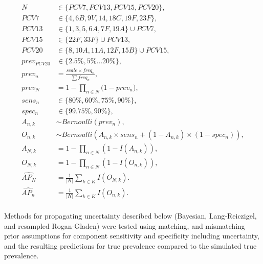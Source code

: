 \documentclass[a4paper, 12pt, twoside]{article}
\begin{document}
\begin{equation*}
\begin{aligned}
N &\in \{PCV7, PCV13, PCV15, PCV20\}, \\
PCV7 &\in \{4, 6B, 9V, 14, 18C, 19F, 23F\}, \\
PCV13 &\in \{1, 3, 5, 6A, 7F, 19A\} \cup PCV7, \\
PCV15 &\in \{22F, 33F\} \cup PCV13,\\
PCV20 &\in \{8, 10A, 11A, 12F, 15B\} \cup PCV15,\\
prev_{PCV20} &\in \{2.5\%, 5\% \dots 20\% \},  \\
prev_n &= \frac{scale \times freq_n}{\sum{freq_n}}, \\
prev_N &= 1-\prod_{n \in N}{\big(1-prev_n}\big), \\
sens_n &\in \{80\%, 60\%, 75\%, 90\% \},  \\
spec_n &\in \{99.75\%,90\% \}, \\
A_{n,k} &\sim Bernoulli(prev_n), \\
O_{n,k} &\sim Bernoulli(A_{n,k} \times sens_n + (1-A_{n,k}) \times (1-spec_n)), \\
A_{N,k} &= 1-\prod_{n \in N}{(1-I(A_{n,k}))}, \\
O_{N,k} &= 1-\prod_{n \in N}{(1-I(O_{n,k}))}, \\
\widehat{AP_N} &= \frac{1}{|K|}\sum_{k \in K}{I(O_{N,k})}. \\
\widehat{AP_n} &= \frac{1}{|K|}\sum_{k \in K}{I(O_{n,k})}. \\
\end{aligned}
\end{equation*}

Methods for propagating uncertainty described below (Bayesian, Lang-Reiczigel, and resampled Rogan-Gladen) were tested using matching, and mismatching prior assumptions for component sensitivity and specificity including uncertainty, and the resulting predictions for true prevalence compared to the simulated true prevalence.
\end{document}
